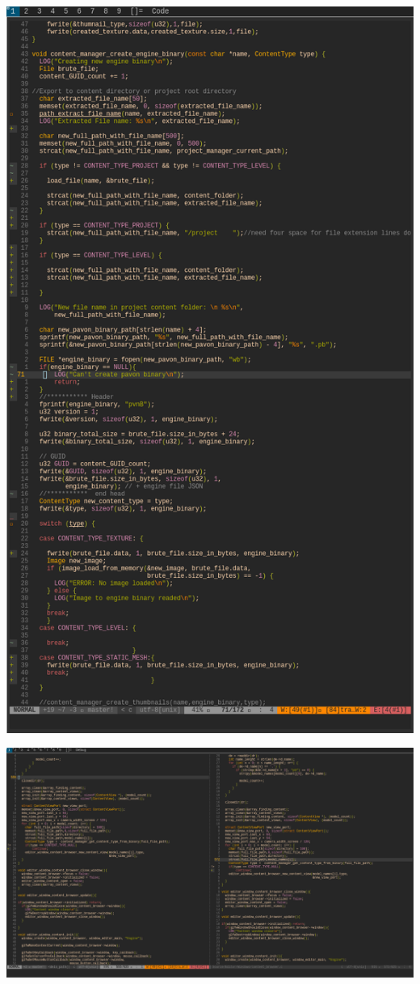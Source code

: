 \documentclass{article}
\begin{document}
  \includegraphics[width=\textwidth]{55.png}

  \includegraphics[width=\textwidth]{54.png}
  
\end{document}
